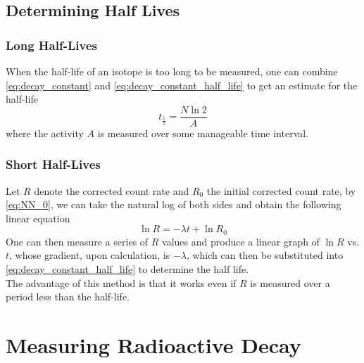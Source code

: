\documentclass[a4paper,12pt]{article}
\let\oldsection\section
\renewcommand\section{\clearpage\oldsection}
\newcommand{\lb}{\\[8pt]}
\begin{document}
\pagebreak

\subsection{Determining Half Lives}

\subsubsection{Long Half-Lives}

When the half-life of an isotope is too long to be measured, one can combine \cref{eq:decay_constant} and \cref{eq:decay_constant_half_life} to get an estimate for the half-life \begin{equation}\label{eq:long_half_life}
  t_{\frac{1}{2}} = \frac{N\ln 2}{A}
\end{equation}
where the activity $A$ is measured over some manageable time interval.

\subsubsection{Short Half-Lives}

Let $R$ denote the corrected count rate and $R_0$ the initial corrected count rate, by \cref{eq:NN_0}, we can take the natural log of both sides and obtain the following linear equation
$$\ln R = -\lambda t + \ln R_0$$
One can then measure a series of $R$ values and produce a linear graph of $\ln R$ vs. $t$, whose gradient, upon calculation, is $-\lambda$, which can then be substituted into \cref{eq:decay_constant_half_life} to determine the half life.\lb
The advantage of this method is that it works even if $R$ is measured over a period less than the half-life.

\section{Measuring Radioactive Decay}
\end{document}
